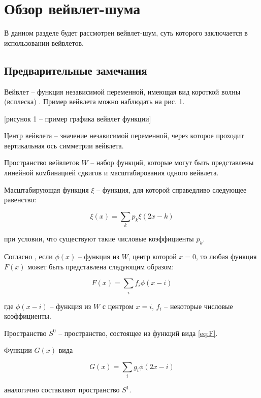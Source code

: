 \chapter{Обзор вейвлет-шума}

В данном разделе будет рассмотрен вейвлет-шум, суть которого заключается в использовании вейвлетов.

\section{Предварительные замечания}

Вейвлет -- функция независимой переменной, имеющая вид короткой волны (всплеска) \cite{Kryzhevich,Smolentsev,Malla}. Пример вейвлета можно наблюдать на рис. 1.

[рисунок 1 -- пример графика вейвлет функции]

Центр вейвлета -- значение независимой переменной, через которое проходит вертикальная ось симметрии вейвлета.

Пространство вейвлетов $W$ -- набор функций, которые могут быть представлены линейной комбинацией сдвигов и масштабирования одного вейвлета. \cite{Novikov,Meyer}

Масштабирующая функция $\xi$ -- функция, для которой справедливо следующее равенство:

\begin{equation}\label{eq:refine}
	\xi(x)=\sum_{k}p_k\xi(2x-k)
\end{equation}

при условии, что существуют такие числовые коэффициенты $p_k$. \cite{pixar,Novikov}

Согласно \cite{pixar}, если $\phi(x)$ -- функция из $W$, центр которой $x=0$, то любая функция $F(x)$ может быть представлена следующим образом:

\begin{equation}\label{eq:F}
	F(x)=\sum_{i}f_i\phi(x-i)
\end{equation}

где $\phi(x-i)$ -- функция из $W$ с центром $x=i$, $f_i$ -- некоторые числовые коэффициенты.

Пространство $S^0$ -- пространство, состоящее из функций вида \ref{eq:F}.

Функции $G(x)$ вида

\begin{equation}\label{eq:G}
	G(x)=\sum_{i}g_i\phi(2x-i)
\end{equation}

аналогично составляют пространство $S^1$. \cite{pixar}


